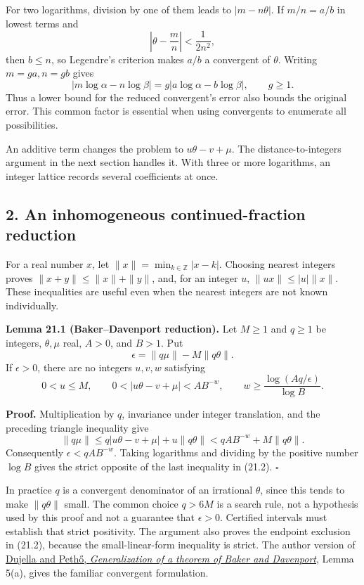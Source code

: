 \documentclass[
  11pt,
  a4paper,
]{article}
\begin{document}
For two logarithms, division by one of them leads to \(|m-n\theta|\). If
\(m/n=a/b\) in lowest terms and \[
 \left|\theta-\frac mn\right|<\frac1{2n^2},
\] then \(b\le n\), so Legendre's criterion makes \(a/b\) a convergent
of \(\theta\). Writing \(m=ga,n=gb\) gives \[
 |m\log\alpha-n\log\beta|
   =g|a\log\alpha-b\log\beta|,\qquad g\ge1.
\] Thus a lower bound for the reduced convergent's error also bounds the
original error. This common factor is essential when using convergents
to enumerate all possibilities.

An additive term changes the problem to \(u\theta-v+\mu\). The
distance-to-integers argument in the next section handles it. With three
or more logarithms, an integer lattice records several coefficients at
once.

\subsection{2. An inhomogeneous continued-fraction
reduction}\label{an-inhomogeneous-continued-fraction-reduction}

For a real number \(x\), let \(\|x\|=\min_{k\in\mathbb Z}|x-k|\).
Choosing nearest integers proves \(\|x+y\|\le\|x\|+\|y\|\), and, for an
integer \(u\), \(\|ux\|\le |u|\|x\|\). These inequalities are useful
even when the nearest integers are not known individually.

\textbf{Lemma 21.1 (Baker--Davenport reduction).} Let \(M\ge1\) and
\(q\ge1\) be integers, \(\theta,\mu\) real, \(A>0\), and \(B>1\). Put \[
 \epsilon=\|q\mu\|-M\|q\theta\|.
 \tag{21.1}
\] If \(\epsilon>0\), there are no integers \(u,v,w\) satisfying \[
 0<u\le M,\qquad
 0<|u\theta-v+\mu|<AB^{-w},\qquad
 w\ge\frac{\log(Aq/\epsilon)}{\log B}.
 \tag{21.2}
\]

\textbf{Proof.} Multiplication by \(q\), invariance under integer
translation, and the preceding triangle inequality give \[
 \|q\mu\|\le q|u\theta-v+\mu|+u\|q\theta\|
             <qAB^{-w}+M\|q\theta\|.
\] Consequently \(\epsilon<qAB^{-w}\). Taking logarithms and dividing by
the positive number \(\log B\) gives the strict opposite of the last
inequality in (21.2). \(\square\)

In practice \(q\) is a convergent denominator of an irrational
\(\theta\), since this tends to make \(\|q\theta\|\) small. The common
choice \(q>6M\) is a search rule, not a hypothesis used by this proof
and not a guarantee that \(\epsilon>0\). Certified intervals must
establish that strict positivity. The argument also proves the endpoint
exclusion in (21.2), because the small-linear-form inequality is strict.
The author version of
\href{https://web.math.pmf.unizg.hr/~duje/pdf/qjm.pdf}{Dujella and
Pethő, \emph{Generalization of a theorem of Baker and Davenport}}, Lemma
5(a), gives the familiar convergent formulation.
\end{document}
